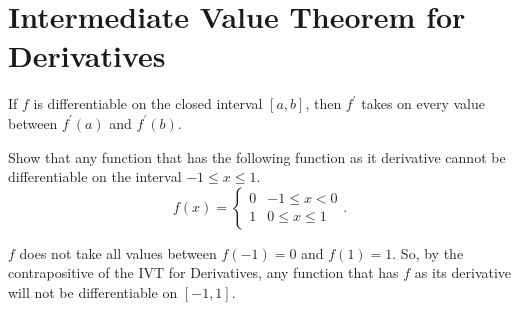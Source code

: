 \section{Intermediate Value Theorem for Derivatives}
\begin{theorem}
	If $f$ is differentiable on the closed interval $[a,b]$, then $f^\prime$ takes on every value between $f^\prime(a)$ and $f^\prime(b)$.
\end{theorem}

\begin{example}
	Show that any function that has the following function as it derivative cannot be differentiable on the interval $-1 \leq x \leq 1$.
	\begin{equation*}
		f(x) = \begin{cases}
			0 & -1 \leq x < 0 \\
			1 & 0 \leq x \leq 1
		\end{cases}.
	\end{equation*}
\end{example}
\begin{answer}
	$f$ does not take all values between $f(-1)=0$ and $f(1)=1$.
	So, by the contrapositive of the IVT for Derivatives, any function that has $f$ as its derivative will not be differentiable on $[-1,1]$.
\end{answer}